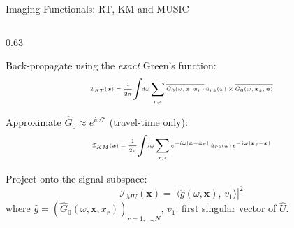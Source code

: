 \documentclass{beamer}
\begin{document}
\begin{frame}{Imaging Functionals: RT, KM and MUSIC}
  \small

  \hspace*{-0.35cm}
  \begin{minipage}{\dimexpr\textwidth+0.7cm\relax}
  \setlength{\columnsep}{0.5pt}
  \begin{columns}[T]
  \begin{column}{0.63\textwidth}
    \begin{tcolorbox}[keybox, title=Reverse-Time (RT) Migration, top=2pt, bottom=2pt]
      \footnotesize
      Back-propagate using the \emph{exact} Green's function:
      \vspace{-0.1cm} 
      \begin{equation*}
        \tiny
      \begin{aligned}
        \mathcal{I}_{RT}(\bm{x}) = \frac{1}{2\pi}\!\int\!\! d\omega \sum_{r,s}
         \overline{\hat{G}_0(\omega, \bm{x}, \bm{x}_r)}\,\hat{u}_{rs}(\omega)
        \times\overline{\hat{G}_0(\omega, \bm{x}_s, \bm{x})}
      \end{aligned}
      \end{equation*}
    \end{tcolorbox}

    \begin{tcolorbox}[warnbox, title=Kirchhoff Migration (KM), top=2pt, bottom=2pt]
      \footnotesize
      Approximate $\hat{G}_0 \approx e^{i\omega\mathcal{T}}$ (travel-time only):
      \vspace{-0.1cm}
      \begin{equation*}
        \tiny
      \begin{aligned}
        \mathcal{I}_{KM}(\bm{x}) = \frac{1}{2\pi}\!\int\!\! d\omega \sum_{r,s}
         e^{-i\omega|\bm{x}-\bm{x}_r|}\,\hat{u}_{rs}(\omega)\,e^{-i\omega|\bm{x}_s - \bm{x}|}
      \end{aligned}
      \end{equation*}
    \end{tcolorbox}


    \begin{tcolorbox}[resultbox, title=MUSIC (Signal-Subspace Projection), top=2pt, bottom=2pt]
      \footnotesize
      Project onto the signal subspace:
      \vspace{-0.15cm}
      {\tiny
      $$\mathcal{I}_{MU}(\bm{x}) = |\langle \hat{g}(\omega, \bm{x}),\, v_1 \rangle|^2$$
      }
      {\scriptsize where $\hat{g} = (\hat{G}_0(\omega, \bm{x}, x_r))_{r=1,\dots,N}$, $v_1$: first singular vector of $\hat{U}$.}
    \end{tcolorbox}
  \end{column}


\end{columns}
\end{minipage}
\end{frame}
\end{document}
